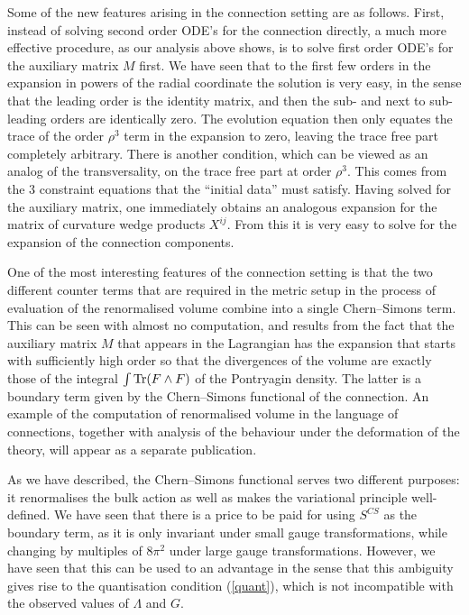 \documentclass[a4paper,12pt]{article}
\begin{document}
Some of the new features arising in the connection setting are as follows. First, instead of solving second order ODE's for the connection directly, a much more effective procedure, as our analysis above shows, is to solve first order ODE's for the auxiliary matrix $M$ first. We have seen that to the first few orders in the expansion in powers of the radial coordinate the solution is very easy, in the sense that the leading order is the identity matrix, and then the sub- and next to sub-leading orders are identically zero. The evolution equation then only equates the trace of the order $\rho^3$ term in the expansion to zero, leaving the trace free part completely arbitrary. There is another condition, which can be viewed as an analog of the transversality, on the trace free part at order $\rho^3$. This comes from the 3 constraint equations that the ``initial data'' must satisfy. Having solved for the auxiliary matrix, one immediately obtains an analogous expansion for the matrix of curvature wedge products $X^{ij}$. From this it is very easy to solve for the expansion of the connection components. 

One of the most interesting features of the connection setting is that the two different counter terms that are required in the metric setup in the process of evaluation of the renormalised volume combine into a single Chern--Simons term. This can be seen with almost no computation, and results from the fact that the auxiliary matrix $M$ that appears in the Lagrangian has the expansion that starts with sufficiently high order so that the divergences of the volume are exactly those of the integral $\int {\rm Tr}(F\wedge F)$ of the Pontryagin density. The latter is a boundary term given by the Chern--Simons functional of the connection. An example of the computation of renormalised volume in the language of connections, together with analysis of the behaviour under the deformation of the theory, will appear as a separate publication. 

As we have described, the Chern--Simons functional serves two different purposes: it renormalises the bulk action as well as makes the variational principle well-defined. We have seen that there is a price to be paid for using $S^{CS}$ as the boundary term, as it is only invariant under small gauge transformations, while changing by multiples of $8\pi^2$ under large gauge transformations. However, we have seen that this can be used to an advantage in the sense that this ambiguity gives rise to the quantisation condition (\ref{quant}), which is not incompatible with the observed values of $\Lambda$ and $G$. 
\end{document}
